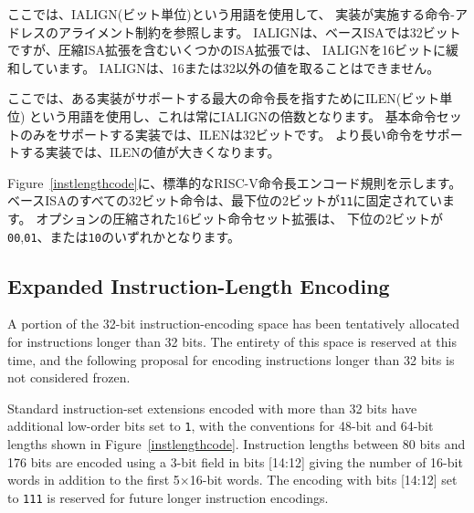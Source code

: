ここでは、IALIGN(ビット単位)という用語を使用して、
実装が実施する命令-アドレスのアライメント制約を参照します。
IALIGNは、ベースISAでは32ビットですが、圧縮ISA拡張を含むいくつかのISA拡張では、
IALIGNを16ビットに緩和しています。
IALIGNは、16または32以外の値を取ることはできません。

ここでは、ある実装がサポートする最大の命令長を指すためにILEN(ビット単位)
という用語を使用し、これは常にIALIGNの倍数となります。
基本命令セットのみをサポートする実装では、ILENは32ビットです。
より長い命令をサポートする実装では、ILENの値が大きくなります。

Figure~\ref{instlengthcode}に、標準的なRISC-V命令長エンコード規則を示します。
ベースISAのすべての32ビット命令は、最下位の2ビットが{\tt 11}に固定されています。
オプションの圧縮された16ビット命令セット拡張は、
下位の2ビットが{\tt 00},{\tt 01}、または{\tt 10}のいずれかとなります。


\subsection*{Expanded Instruction-Length Encoding}

A portion of the 32-bit instruction-encoding space has been tentatively
allocated for instructions longer than 32 bits.  The entirety of this space is
reserved at this time, and the following proposal for encoding instructions
longer than 32 bits is not considered frozen.

Standard instruction-set extensions
encoded with more than 32 bits have additional low-order bits set to {\tt 1},
with the conventions for 48-bit and 64-bit lengths shown in
Figure~\ref{instlengthcode}.  Instruction lengths between 80 bits and 176 bits
are encoded using a 3-bit field in bits [14:12] giving the number of 16-bit
words in addition to the first 5$\times$16-bit words.  The encoding with bits
[14:12] set to {\tt 111} is reserved for future longer instruction encodings.


